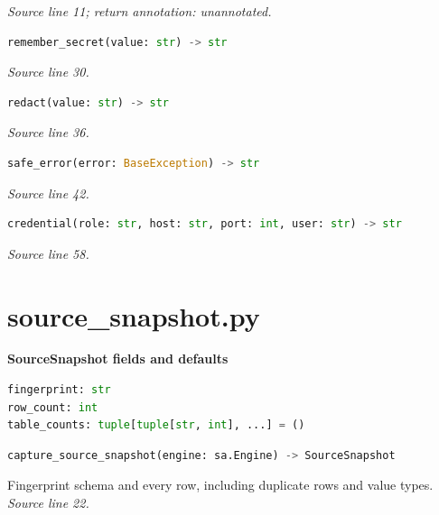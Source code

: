 {\small \textit{Source line 11; return annotation: unannotated.}}



\begin{lstlisting}[language=Python]
remember_secret(value: str) -> str
\end{lstlisting}


{\small \textit{Source line 30.}}



\begin{lstlisting}[language=Python]
redact(value: str) -> str
\end{lstlisting}


{\small \textit{Source line 36.}}



\begin{lstlisting}[language=Python]
safe_error(error: BaseException) -> str
\end{lstlisting}


{\small \textit{Source line 42.}}



\begin{lstlisting}[language=Python]
credential(role: str, host: str, port: int, user: str) -> str
\end{lstlisting}


{\small \textit{Source line 58.}}

\section{source\_snapshot.py}


\textbf{SourceSnapshot fields and defaults}


\begin{lstlisting}[language=Python]
fingerprint: str
row_count: int
table_counts: tuple[tuple[str, int], ...] = ()
\end{lstlisting}




\begin{lstlisting}[language=Python]
capture_source_snapshot(engine: sa.Engine) -> SourceSnapshot
\end{lstlisting}


{\small Fingerprint schema and every row, including duplicate rows and value types. \textit{Source line 22.}}


